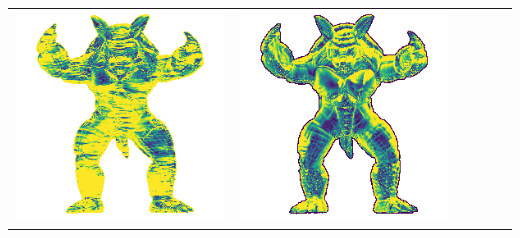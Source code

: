 \begin{tabularx}{\linewidth}{@{}Y@{}Y@{}Y@{}Y@{}Y@{}Y@{}}
\includegraphics[width=\linewidth]{semisynthetic/20150514_22_yu_err.png} &
\includegraphics[width=\linewidth]{semisynthetic/20150514_22_dpsn_err.png} &

\end{tabularx}
